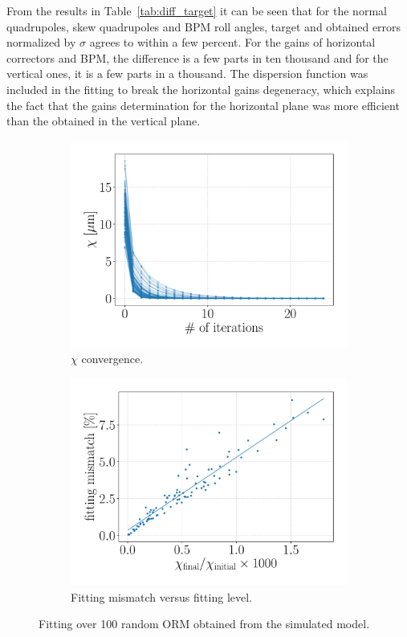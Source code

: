 From the results in Table~\ref{tab:diff_target} it can be seen that for the normal quadrupoles, skew quadrupoles and BPM roll angles, target and obtained errors normalized by $\sigma$ agrees to within a few percent. For the gains of horizontal correctors and BPM, the difference is a few parts in ten thousand and for the vertical ones, it is a few parts in a thousand. The dispersion function was included in the fitting to break the horizontal gains degeneracy, which explains the fact that the gains determination for the horizontal plane was more efficient than the obtained in the vertical plane.
\begin{figure}
\centering
\begin{subfigure}[t]{0.49\textwidth}
\includegraphics[width=1.0\textwidth]{figures/chi_seeds_grid_big.pdf}
    \caption{$\chi$ convergence.}
    \label{subfig:chi_seeds}
\end{subfigure}
 \begin{subfigure}[t]{0.49\textwidth}
\includegraphics[width=1.0\textwidth]{figures/chi_versus_score_grid_big.pdf}
    \caption{Fitting mismatch versus fitting level.}
    \label{subfig:chi_versus_score}
\end{subfigure}
\caption{Fitting over 100 random ORM obtained from the simulated model.}
\label{fig:fitting_seeds}
\end{figure}
